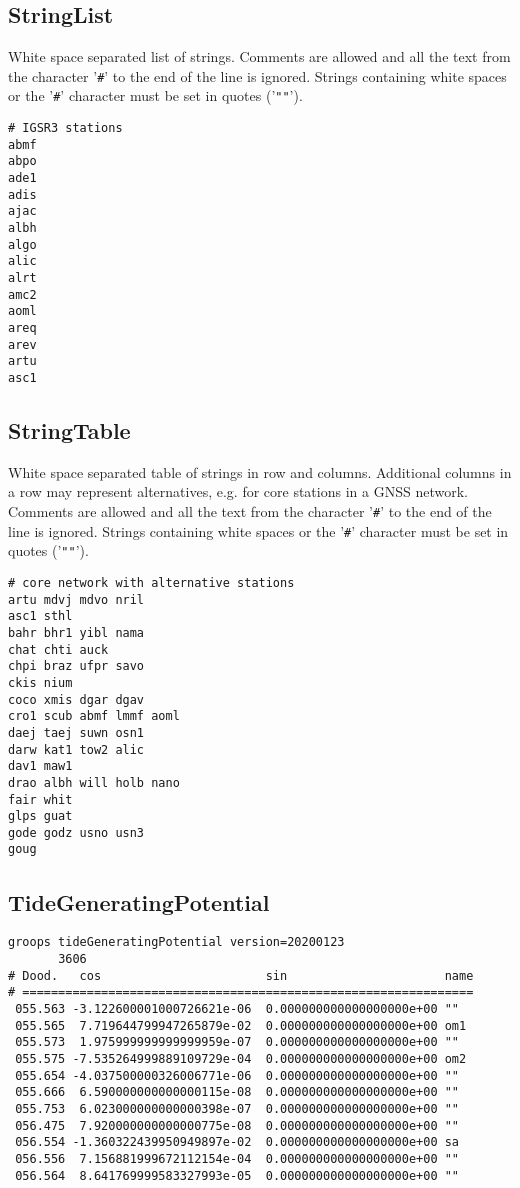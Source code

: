 \subsection{StringList}\label{general.fileFormat:stringList}
White space separated list of strings.
Comments are allowed and all the text from the character '\verb|#|' to the end of the line is ignored.
Strings containing white spaces or the '\verb|#|' character must be set in quotes ('\verb|""|').

\begin{verbatim}
# IGSR3 stations
abmf
abpo
ade1
adis
ajac
albh
algo
alic
alrt
amc2
aoml
areq
arev
artu
asc1
\end{verbatim}


\subsection{StringTable}\label{general.fileFormat:stringTable}
White space separated table of strings in row and columns.
Additional columns in a row may represent alternatives, e.g. for core stations in a GNSS network.
Comments are allowed and all the text from the character '\verb|#|' to the end of the line is ignored.
Strings containing white spaces or the '\verb|#|' character must be set in quotes  ('\verb|""|').

\begin{verbatim}
# core network with alternative stations
artu mdvj mdvo nril
asc1 sthl
bahr bhr1 yibl nama
chat chti auck
chpi braz ufpr savo
ckis nium
coco xmis dgar dgav
cro1 scub abmf lmmf aoml
daej taej suwn osn1
darw kat1 tow2 alic
dav1 maw1
drao albh will holb nano
fair whit
glps guat
gode godz usno usn3
goug
\end{verbatim}


\subsection{TideGeneratingPotential}\label{general.fileFormat:tideGeneratingPotential}

\begin{verbatim}
groops tideGeneratingPotential version=20200123
       3606
# Dood.   cos                       sin                      name
# ===============================================================
 055.563 -3.122600001000726621e-06  0.000000000000000000e+00 ""
 055.565  7.719644799947265879e-02  0.000000000000000000e+00 om1
 055.573  1.975999999999999959e-07  0.000000000000000000e+00 ""
 055.575 -7.535264999889109729e-04  0.000000000000000000e+00 om2
 055.654 -4.037500000326006771e-06  0.000000000000000000e+00 ""
 055.666  6.590000000000000115e-08  0.000000000000000000e+00 ""
 055.753  6.023000000000000398e-07  0.000000000000000000e+00 ""
 056.475  7.920000000000000775e-08  0.000000000000000000e+00 ""
 056.554 -1.360322439950949897e-02  0.000000000000000000e+00 sa
 056.556  7.156881999672112154e-04  0.000000000000000000e+00 ""
 056.564  8.641769999583327993e-05  0.000000000000000000e+00 ""
\end{verbatim}



